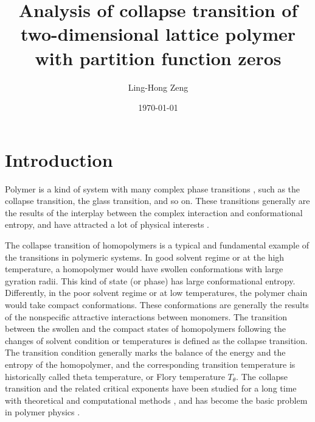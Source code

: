 \documentclass[preprint,preprintnumbers,amsmath,amssymb,showpacs,aps,pre]{revtex4-1}
\begin{document}
\title{Analysis of collapse transition of two-dimensional lattice
polymer with partition function zeros}
\author{Ling-Hong Zeng}


\date{\today}

\begin{abstract}

\end{abstract}


\maketitle

\section{Introduction}

Polymer is a kind of system with many complex phase transitions
\cite{LifshitzRMP78}, such as the collapse transition\cite{FloryJCP49,
FloryBOOK67,WilliamsARPC81}, the glass transition\cite{GibbsJCP58,
JackleRPP86}, and so on. These transitions generally are the results
of the interplay between the complex interaction and conformational
entropy, and have attracted a lot of physical interests
\cite{LifshitzRMP78,FloryJCP49,FloryBOOK67,WilliamsARPC81,GibbsJCP58,
JackleRPP86,deGennesBook79,StephenPLA75,RigByJCP1987,BellRMP93,
ChengARMR,PrivmanBook81,ZivPCCP09,ChengBook08}.

The collapse transition of homopolymers is a typical and fundamental
example of the transitions in polymeric systems\cite{LifshitzRMP78,
FloryBOOK67,deGennesBook79,ZivPCCP09,ChengBook08}. In good solvent
regime or at the high temperature, a homopolymer would have swollen
conformations with large gyration radii. This kind of state (or phase)
has large conformational entropy. Differently, in the poor solvent
regime or at low temperatures, the polymer chain would take compact
conformations. These conformations are generally the results of the
nonspecific attractive interactions between monomers. The transition
between the swollen and the compact states of homopolymers following
the changes of solvent condition or temperatures is defined as the
collapse transition. The transition condition generally marks the
balance of the energy and the entropy of the homopolymer, and the
corresponding transition temperature is historically called theta
temperature, or Flory temperature $T_{\theta}$\cite{FloryJCP49}.
The collapse transition and the related critical exponents have been
studied for a long time with theoretical and computational methods
\cite{deGennesBook79,PrivmanBook81,ZivPCCP09,SaleurJSP86,
DuplantierPRL87,StanleyPRB89,BinderBook95,OYJCP08,CaparicaCPC09,
BinderBook10}, and has become the basic problem in polymer physics
\cite{LifshitzRMP78,deGennesBook79,ZivPCCP09,ChengBook08}.
\end{document}
